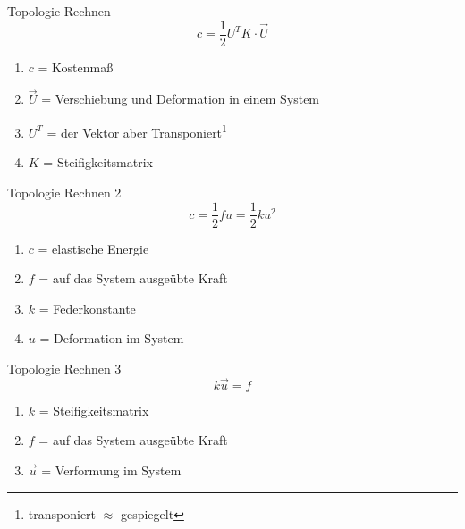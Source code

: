 \documentclass{beamer}
\begin{document}
\begin{frame}{Topologie Rechnen}
\begin{equation}
    c=\frac{1}{2}U^{T}K\cdot \vec{U}
\end{equation}

\begin{enumerate}
    \item $c$ = Kostenma\ss
    \item $\vec{U}$ = Verschiebung und Deformation in einem System
    \item $U^T$ = der Vektor aber Transponiert\footnote{transponiert $\approx$ gespiegelt}
    \item $K$ = Steifigkeitsmatrix
\end{enumerate}
\end{frame}



\begin{frame}{Topologie Rechnen 2}
\begin{equation}
    c = \frac{1}{2}fu = \frac{1}{2}ku^2
\end{equation}

\begin{enumerate}
    \item $c$ = elastische Energie
    \item $f$ = auf das System ausge\"ubte Kraft
    \item $k$ = Federkonstante
    \item $u$ = Deformation im System
\end{enumerate}
\end{frame}



\begin{frame}{Topologie Rechnen 3}
    \begin{equation}
        k\vec{u} = f
    \end{equation}
    \begin{enumerate}
        \item $k$ = Steifigkeitsmatrix
        \item $f$ = auf das System ausge\"ubte Kraft
        \item $\vec{u}$ = Verformung im System
    \end{enumerate}
\end{frame}
\end{document}

